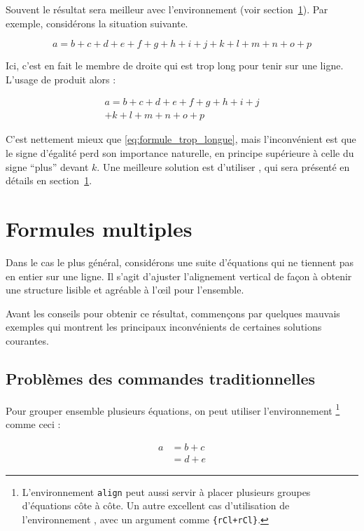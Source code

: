 Souvent le résultat sera
meilleur avec l'environnement  (voir
section~\ref{sec:IEEEeqnarray}). Par exemple, considérons la situation
suivante.
\begin{example}
\begin{equation}
  a = b + c + d + e + f 
  + g + h + i + j 
  + k + l + m + n + o + p  
  \label{eq:formule_trop_longue}
\end{equation}
\end{example}
\noindent
Ici, c'est en fait le membre de droite qui est trop long pour tenir sur une
ligne. L'usage de  produit alors :
\begin{example}
\begin{multline}
  a = b + c + d + e + f 
  + g + h + i + j \\
  + k + l + m + n + o + p
\end{multline}
\end{example}

C'est nettement mieux que \eqref{eq:formule_trop_longue}, mais
l'inconvénient est que le signe d'égalité perd son importance naturelle, en
principe supérieure à celle du signe \enquote{plus} devant $k$. Une meilleure
solution est d'utiliser , qui sera présenté en détails en
section~\ref{sec:IEEEeqnarray}.


\section{Formules multiples}
\label{sec:IEEEeqnarray}

Dans le cas le plus général, considérons une suite d'équations qui ne tiennent
pas en entier sur une ligne. Il s'agit d'ajuster l'alignement vertical de
façon à obtenir une structure lisible et agréable à l'\oe il pour l'ensemble.

Avant les conseils pour obtenir ce résultat, commençons par quelques mauvais
exemples qui montrent les principaux inconvénients de certaines solutions
courantes.

\subsection{Problèmes des commandes traditionnelles}
\label{sec:problems_traditional}

Pour grouper ensemble plusieurs équations, on peut utiliser
l'environnement \footnote{L'environnement \texttt{align} peut aussi
  servir à placer plusieurs groupes d'équations côte à côte. Un autre excellent
  cas d'utilisation de l'environnement , avec un
  argument comme
  \texttt{\{rCl+rCl\}}.} comme ceci :
\begin{example}
 \begin{align}
  a & = b + c \\
  & = d + e
 \end{align}
\end{example}

